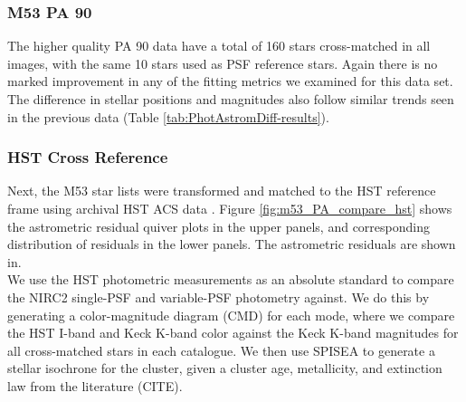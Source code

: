 \documentclass[]{spie}  %
\begin{document}
\subsubsection{M53 PA 90} \label{sec:result-m53-pa90}
The higher quality PA 90 data have a total of 160 stars cross-matched in all images, with the same 10 stars used as PSF reference stars. Again there is no marked improvement in any of the fitting metrics we examined for this data set. The difference in stellar positions and magnitudes also follow similar trends seen in the previous data (Table \ref{tab:PhotAstromDiff-results}).


\subsubsection{HST Cross Reference} \label{sec:m53-hst}

\indent Next, the M53 star lists were transformed and matched to the HST reference frame using archival HST ACS data \cite{service:2016a}. Figure \ref{fig:m53_PA_compare_hst} shows the astrometric residual quiver plots in the upper panels, and corresponding distribution of residuals in the lower panels. The astrometric residuals are shown in.
\\
\indent We use the HST photometric measurements as an absolute standard to compare the NIRC2 single-PSF and variable-PSF photometry against. We do this by generating a color-magnitude diagram (CMD) for each mode, where we compare the HST I-band and Keck K-band color against the Keck K-band magnitudes for all cross-matched stars in each catalogue. We then use SPISEA to generate a stellar isochrone for the cluster, given a cluster age, metallicity, and extinction law from the literature (CITE).
\end{document}

